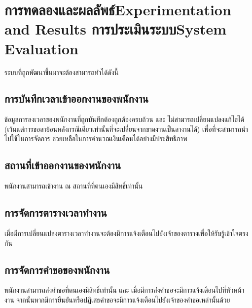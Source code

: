 \chapter{\ifproject%
\ifcpe การทดลองและผลลัพธ์\else Experimentation and Results\fi
\else%
\ifcpe การประเมินระบบ\else System Evaluation\fi
\fi}

ระบบที่ถูกพัฒนาขึ้นมาจะต้องสามารถทำได้ดังนี้ 

\section{การบันทึกเวลาเข้าออกงานของพนักงาน} 
ข้อมูลการลงเวลาของพนักงานที่ถูกบันทึกต้องถูกต้องครบถ้วน และ ไม่สามารถเปลี่ยนแปลงแก้ไขได้ (เว้นแต่การขอลาย้อนหลังกรณีเดียวเท่านั้นที่จะเปลี่ยนจากขาดงานเป็นลางานได้) เพื่อที่จะสามารถนำไปใช้ในการจัดการ ช่วยเหลือในการคำนวณเงินเดือนได้อย่างมีประสิทธิภาพ 

\section{สถานที่เข้าออกงานของพนักงาน}
พนักงานสามารถเข้างาน ณ สถานที่ที่ตนเองมีสิทธิ์เท่านั้น

\section{การจัดการตารางเวลาทำงาน}
เมื่อมีการเปลี่ยนแปลงตารางเวลาทำงานจะต้องมีการแจ้งเตือนไปยังเจ้าของตารางเพื่อให้รับรู้เข้าใจตรงกัน 

\section{การจัดการคำขอของพนักงาน}
พนักงานสามารถส่งคำขอที่ตนเองมีสิทธิ์เท่านั้น และ เมื่อมีการส่งคำขอจะมีการแจ้งเตือนไปที่หัวหน้างาน จากนั้นหากมีการยืนยันหรือปฎิเสธคำขอจะมีการแจ้งเตือนไปยังเจ้าของคำขอเหล่านั้นด้วย
